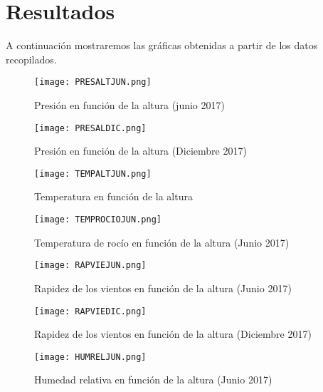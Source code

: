 \documentclass[12pt]{article}
\begin{document}
\section{Resultados}

A continuación mostraremos las gráficas obtenidas a partir de los datos recopilados.


\begin{figure}
\begin{centering}
  \texttt{[image: PRESALTJUN.png]}
  \caption{Presión en función de la altura (junio 2017)}
\end{centering}
\end{figure}

\begin{figure}
\begin{centering}
  \texttt{[image: PRESALDIC.png]}
  \caption{Presión en función de la altura (Diciembre 2017)}
\end{centering}
\end{figure}

\begin{figure}
\begin{centering}
  \texttt{[image: TEMPALTJUN.png]}
  \caption{Temperatura en función de la altura}
\end{centering}
\end{figure}

\begin{figure}
\begin{centering}
  \texttt{[image: TEMPROCIOJUN.png]}
  \caption{Temperatura de rocío en función de la altura (Junio 2017)}
\end{centering}
\end{figure}

\begin{figure}
\begin{centering}
  \texttt{[image: RAPVIEJUN.png]}
  \caption{Rapidez de los vientos en función de la altura (Junio 2017)}
\end{centering}
\end{figure}

\begin{figure}
\begin{centering}
  \texttt{[image: RAPVIEDIC.png]}
  \caption{Rapidez de los vientos en función de la altura (Diciembre 2017)}
\end{centering}
\end{figure}

\begin{figure}
\begin{centering}
  \texttt{[image: HUMRELJUN.png]}
  \caption{Humedad relativa en función de la altura (Junio 2017)}
\end{centering}
\end{figure}
\end{document}
